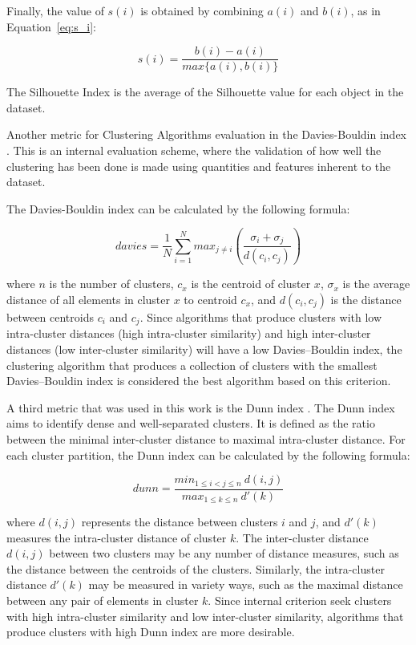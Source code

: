 \documentclass[conference]{IEEEtran}
\begin{document}
	
	Finally, the value of $s(i)$ is obtained by combining $a(i)$ and $b(i)$, as in  Equation~\ref{eq:s_i}:
	
	
	\begin{equation} \label{eq:s_i}
	s(i) = \frac{b(i) - a(i)}{max\{a(i), b(i)\}}
	\end{equation}
	
	The Silhouette Index is the average of the Silhouette value for each object in the dataset.
	
	Another metric for Clustering Algorithms evaluation in the Davies-Bouldin index \cite{davies1979cluster}. This is an internal evaluation scheme, where the validation of how well the clustering has been done is made using quantities and features inherent to the dataset.
	
	The Davies-Bouldin index can be calculated by the following formula:
	
	\begin{equation} \label{eq:davies}
		davies = \frac{1}{N} \sum_{i=1}^{N} max_{j \neq i} \left(\frac{\sigma_i + \sigma_j}{d(c_i, c_j)}\right)
	\end{equation}
	
	where $n$ is the number of clusters, $c_x$ is the centroid of cluster $x$, $\sigma_x$ is the average distance of all elements in cluster $x$ to centroid $c_x$, and $d(c_i, c_j)$ is the distance between centroids $c_i$ and $c_j$. Since algorithms that produce clusters with low intra-cluster distances (high intra-cluster similarity) and high inter-cluster distances (low inter-cluster similarity) will have a low Davies–Bouldin index, the clustering algorithm that produces a collection of clusters with the smallest Davies–Bouldin index is considered the best algorithm based on this criterion.
	
	
	A third metric that was used in this work is the Dunn index \cite{dunn1973fuzzy}. The Dunn index aims to identify dense and well-separated clusters. It is defined as the ratio between the minimal inter-cluster distance to maximal intra-cluster distance. For each cluster partition, the Dunn index can be calculated by the following formula:
	
	\begin{equation} \label{eq:dunn}
		dunn = \frac{min_{1\le i < j\le n}~d(i, j)}{max_{1\le k \le n}~d'(k)}
	\end{equation}
	
	
	where $d(i, j)$ represents the distance between clusters $i$ and $j$, and $d'(k)$ measures the intra-cluster distance of cluster $k$. The inter-cluster distance $d(i, j)$ between two clusters may be any number of distance measures, such as the distance between the centroids of the clusters. Similarly, the intra-cluster distance $d'(k)$ may be measured in variety ways, such as the maximal distance between any pair of elements in cluster $k$. Since internal criterion seek clusters with high intra-cluster similarity and low inter-cluster similarity, algorithms that produce clusters with high Dunn index are more desirable.
	
\end{document}
